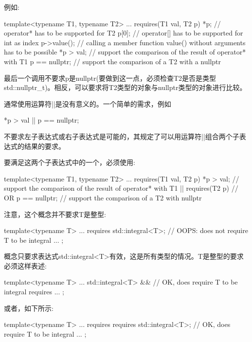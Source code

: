 例如:

\begin{cpp}
template<typename T1, typename T2>
... requires(T1 val, T2 p) {
		*p; // operator* has to be supported for T2
		p[0]; // operator[] has to be supported for int as index
		p->value(); // calling a member function value() without arguments has to be possible
		*p > val; // support the comparison of the result of operator* with T1
		p == nullptr; // support the comparison of a T2 with a nullptr
	}
\end{cpp}

最后一个调用不要求p是nullptr(要做到这一点，必须检查T2是否是类型std::nullptr\_t)。相反，可以要求将T2类型的对象与nullptr类型的对象进行比较。

通常使用运算符||是没有意义的。一个简单的需求，例如

\begin{cpp}
*p > val || p == nullptr;
\end{cpp}

不要求左子表达式或右子表达式是可能的，其规定了可以用运算符||组合两个子表达式的结果的要求。

要满足这两个子表达式中的一个，必须使用:

\begin{cpp}
template<typename T1, typename T2>
... requires(T1 val, T2 p) {
		*p > val; // support the comparison of the result of operator* with T1
	}
	|| requires(T2 p) { // OR
		p == nullptr; // support the comparison of a T2 with nullptr
	}
\end{cpp}

注意，这个概念并不要求T是整型:

\begin{cpp}
template<typename T>
... requires {
		std::integral<T>; // OOPS: does not require T to be integral
		...
	};
\end{cpp}

概念只要求表达式std::integral<T>有效，这是所有类型的情况。T是整型的要求必须这样表述:

\begin{cpp}
template<typename T>
... std::integral<T> && // OK, does require T to be integral
	requires {
		...
	};
\end{cpp}

或者，如下所示:

\begin{cpp}
template<typename T>
... requires {
		requires std::integral<T>; // OK, does require T to be integral
		...
	};
\end{cpp}

